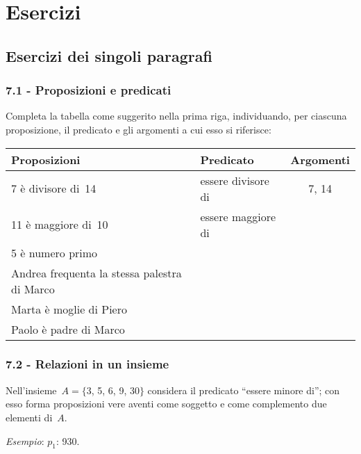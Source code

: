 \section{Esercizi}
\subsection{Esercizi dei singoli paragrafi}
\subsubsection*{7.1 - Proposizioni e predicati}

\begin{esercizio}
\label{ese:7.1}
Completa la tabella come suggerito nella prima riga, individuando, per ciascuna proposizione, il predicato e gli argomenti a cui esso si riferisce:
\begin{center}
\begin{tabular}{llc}
\toprule
Proposizioni & Predicato & Argomenti\\
\midrule
7 è divisore di~14 & essere divisore di & 7, 14 \\
11 è maggiore di~10 & essere maggiore di & \\
5 è numero primo & & \\
Andrea frequenta la stessa palestra di Marco & & \\
Marta è moglie di Piero & & \\
Paolo è padre di Marco & & \\
\bottomrule
\end{tabular}
\end{center}
\end{esercizio}

\subsubsection*{7.2 - Relazioni in un insieme}
\begin{esercizio}
\label{ese:7.2}
Nell'insieme~$A = \{$3, 5, 6, 9, 30$\}$ considera il predicato ``essere minore di''; con esso forma proposizioni vere aventi come soggetto e come complemento due elementi di~$A$.

\emph{Esempio}: $p_1$: 930.
\end{esercizio}

